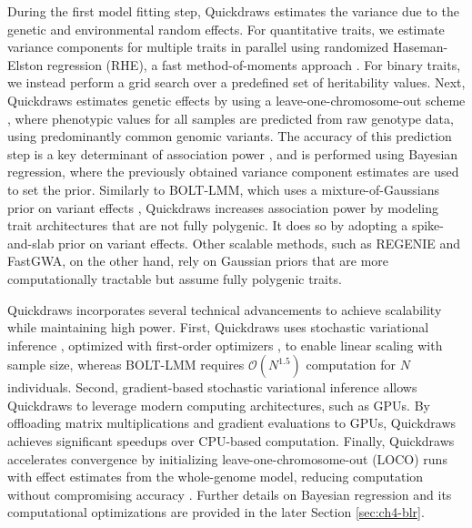 During the first model fitting step, Quickdraws estimates the variance due to the genetic and environmental random effects.
%
For quantitative traits, we estimate variance components for multiple traits in parallel using randomized Haseman-Elston regression (RHE), a fast method-of-moments approach \cite{wu2018scalable,pazokitoroudi2020efficient,zhu2024ARGRHE}.
%
For binary traits, we instead perform a grid search over a predefined set of heritability values.
%
Next, Quickdraws estimates genetic effects by using a leave-one-chromosome-out scheme \cite{lippert2011fast, listgarten2012improved, yang2014advantages, loh2015efficient}, where phenotypic values for all samples are predicted from raw genotype data, using predominantly common genomic variants.
%
The accuracy of this prediction step is a key determinant of association power \cite{yang2014advantages}, and is performed using Bayesian regression, where the previously obtained variance component estimates are used to set the prior.
%
Similarly to BOLT-LMM, which uses a mixture-of-Gaussians prior on variant effects \cite{loh2015efficient,loh2018mixed}, Quickdraws increases association power by modeling trait architectures that are not fully polygenic.
%
It does so by adopting a spike-and-slab prior on variant effects.
%
Other scalable methods, such as REGENIE and FastGWA, on the other hand, rely on Gaussian priors that are more computationally tractable but assume fully polygenic traits.
%


Quickdraws incorporates several technical advancements to achieve scalability while maintaining high power.
%
First, Quickdraws uses stochastic variational inference \cite{graves2011practical,hoffman2013stochastic}, optimized with first-order optimizers \cite{robbins1951stochastic,kingma2014adam}, to enable linear scaling with sample size, whereas BOLT-LMM requires $\mathcal{O}(N^{1.5})$ computation for $N$ individuals.
%
Second, gradient-based stochastic variational inference allows Quickdraws to leverage modern computing architectures, such as GPUs.
%
By offloading matrix multiplications and gradient evaluations to GPUs, Quickdraws achieves significant speedups over CPU-based computation.
%
Finally, Quickdraws accelerates convergence by initializing leave-one-chromosome-out (LOCO) runs with effect estimates from the whole-genome model, reducing computation without compromising accuracy \cite{pan2009survey}.
%
Further details on Bayesian regression and its computational optimizations are provided in the later Section \ref{sec:ch4-blr}.

